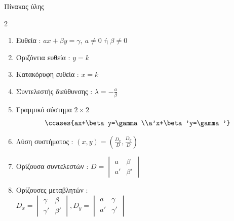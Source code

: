 \documentclass[twoside,nofonts,internet,math,spyros]{frontisthrio}
\begin{document}
\begin{mybox}[mysubtitle]{Πίνακας ύλης}
\begin{multicols}{2}
\begin{enumerate}[itemsep=0mm]
\item Ευθεία : $ ax+\beta y=\gamma,\ a\neq0\textrm{ ή }\beta\neq0 $
\item Οριζόντια ευθεία : $ y=k $
\item Κατακόρυφη ευθεία : $ x=k $
\item Συντελεστής διεύθυνσης : $ \lambda=-\frac{a}{\beta} $
\item Γραμμικό σύστημα $ 2\times 2 $
\[ \ccases{ax+\beta y=\gamma\\a'x+\beta'y=\gamma'} \]
\item Λύση συστήματος : $ (x,y)=\left(\frac{D_x}{D},\frac{D_y}{D}\right) $
\item Ορίζουσα συντελεστών : $ D=\begin{vmatrix}
a & \beta\\a' & \beta'
\end{vmatrix}$
\item Ορίζουσες μεταβλητών :\\$ D_x=\begin{vmatrix}
\gamma & \beta\\\gamma' & \beta'
\end{vmatrix},D_y=\begin{vmatrix}
a & \gamma\\a' & \gamma'
\end{vmatrix} $
\end{enumerate}
\end{multicols}

\end{mybox}
\newpage
\end{document}
